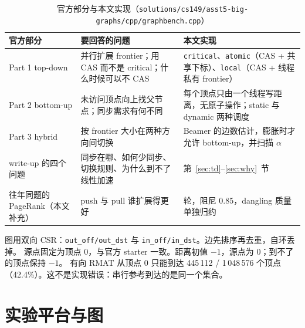 \documentclass[11pt,a4paper]{ctexart}
\begin{document}
\begin{table}[H]
\centering
\caption{官方部分与本文实现（\texttt{solutions/cs149/asst5-big-graphs/cpp/graphbench.cpp}）}
\label{tab:map}
\small
\begin{tabularx}{\linewidth}{>{\raggedright}p{3.2cm}>{\raggedright}X>{\raggedright\arraybackslash}X}
\toprule
官方部分 & 要回答的问题 & 本文实现 \\
\midrule
Part 1 top-down & 并行扩展 frontier；用 CAS 而不是 critical；什么时候可以不 CAS & \texttt{critical}、\texttt{atomic}（CAS + 共享下标）、\texttt{local}（CAS + 线程私有 frontier） \\
Part 2 bottom-up & 未访问顶点向上找父节点；同步需求有何不同 & 每个顶点只由一个线程写距离，无原子操作；static 与 dynamic 两种调度 \\
Part 3 hybrid & 按 frontier 大小在两种方向间切换 & Beamer 的边数估计，膨胀时才允许 bottom-up，并扫描 $\alpha$ \\
write-up 的四个问题 & 同步在哪、如何少同步、切换规则、为什么到不了线性加速 & 第~\ref{sec:td}--\ref{sec:why}~节 \\
\midrule
往年同题的 PageRank（本文补充） & push 与 pull 谁扩展得更好 & 10 轮，阻尼 0.85，dangling 质量单独归约 \\
\bottomrule
\end{tabularx}
\end{table}

图用双向 CSR：\texttt{out\_off/out\_dst} 与 \texttt{in\_off/in\_dst}。边先排序再去重，自环丢掉。
源点固定为顶点 0，与官方 starter 一致。距离初值 $-1$，源点为 0；到不了的顶点保持 $-1$。
有向 RMAT 从顶点 0 只能到达 445\,112 / 1\,048\,576 个顶点（42.4\%）。这不是实现错误：串行参考到达的是同一个集合。

\section{实验平台与图}
\label{sec:setup}
\end{document}
